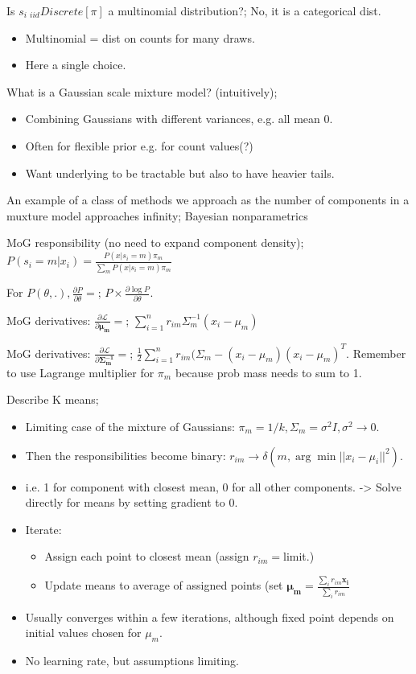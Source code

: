 \documentclass{article}
\begin{document}
Is $s_i~_{iid}Discrete[\pi]$ a multinomial distribution?; No, it is a categorical dist. \begin{itemize}
	\item Multinomial = dist on counts for many draws.
	\item Here a single choice.
\end{itemize}

What is a Gaussian scale mixture model? (intuitively); \begin{itemize}
	\item Combining Gaussians with different variances, e.g. all mean 0. 
	\item Often for flexible prior e.g. for count values(?)
	\item Want underlying to be tractable but also to have heavier tails.
\end{itemize}

An example of a class of methods we approach as the number of components in a muxture model approaches infinity; Bayesian nonparametrics

MoG responsibility (no need to expand component density); $P(s_i=m|x_i) = \frac{P(x|s_i=m)\pi_m}{\sum_m P(x|s_i=m)\pi_m}$

For $P(\theta, .), \frac{\partial P}{\partial \theta} =$; $P\times \frac{\partial\log P}{\partial \theta}$.

MoG derivatives: $\frac{\partial \mathcal{L}}{\partial \mathbf{\mu_m}} =$; $\sum_{i=1}^n r_{im}\Sigma^{-1}_m(x_i-\mu_m)$

MoG derivatives: $\frac{\partial \mathcal{L}}{\partial \mathbf{\Sigma^{-1}_m}} =$; $\frac{1}{2}\sum_{i=1}^n r_{im}(\Sigma_m-(x_i-\mu_m)(x_i-\mu_m)^T$. \newline Remember to use Lagrange multiplier for $\pi_m$ because prob mass needs to sum to 1.

Describe K means; \begin{itemize}
	\item Limiting case of the mixture of Gaussians: $\pi_m = 1/k, \Sigma_m=\sigma^2I, \sigma^2\rightarrow 0$. 
	\item Then the responsibilities become binary: $r_{im}\rightarrow\delta(m, \arg\min ||x_i-\mu_i||^2)$.
	\item i.e. 1 for component with closest mean, 0 for all other components. -> Solve directly for means by setting gradient to 0.
	\item Iterate: \begin{itemize}
		\item Assign each point to closest mean (assign $r_{im}=$limit.)
		\item Update means to average of assigned points (set $\mathbf{\mu_m}=\frac{\sum_i r_{im}\mathbf{x_i}}{\sum_i r_{im}}$
	\end{itemize}
\item Usually converges within a few iterations, although fixed point depends on initial values chosen for $\mu_m$.
\item No learning rate, but assumptions limiting.
\end{itemize}
\end{document}
